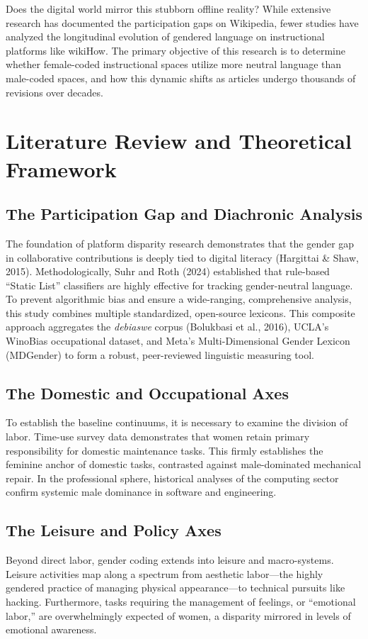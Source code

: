 \documentclass[11pt, a4paper]{article}
\begin{document}
Does the digital world mirror this stubborn offline reality? While extensive research has documented the participation gaps on Wikipedia, fewer studies have analyzed the longitudinal evolution of gendered language on instructional platforms like wikiHow. The primary objective of this research is to determine whether female-coded instructional spaces utilize more neutral language than male-coded spaces, and how this dynamic shifts as articles undergo thousands of revisions over decades. 

\section{Literature Review and Theoretical Framework}

\subsection{The Participation Gap and Diachronic Analysis}
The foundation of platform disparity research demonstrates that the gender gap in collaborative contributions is deeply tied to digital literacy (Hargittai \& Shaw, 2015). Methodologically, Suhr and Roth (2024) established that rule-based ``Static List'' classifiers are highly effective for tracking gender-neutral language. To prevent algorithmic bias and ensure a wide-ranging, comprehensive analysis, this study combines multiple standardized, open-source lexicons. This composite approach aggregates the \textit{debiaswe} corpus (Bolukbasi et al., 2016), UCLA's WinoBias occupational dataset, and Meta's Multi-Dimensional Gender Lexicon (MDGender) to form a robust, peer-reviewed linguistic measuring tool.

\subsection{The Domestic and Occupational Axes}
To establish the baseline continuums, it is necessary to examine the division of labor. Time-use survey data demonstrates that women retain primary responsibility for domestic maintenance tasks. This firmly establishes the feminine anchor of domestic tasks, contrasted against male-dominated mechanical repair. In the professional sphere, historical analyses of the computing sector confirm systemic male dominance in software and engineering.

\subsection{The Leisure and Policy Axes}
Beyond direct labor, gender coding extends into leisure and macro-systems. Leisure activities map along a spectrum from aesthetic labor---the highly gendered practice of managing physical appearance---to technical pursuits like hacking. Furthermore, tasks requiring the management of feelings, or ``emotional labor,'' are overwhelmingly expected of women, a disparity mirrored in levels of emotional awareness. 
\end{document}
